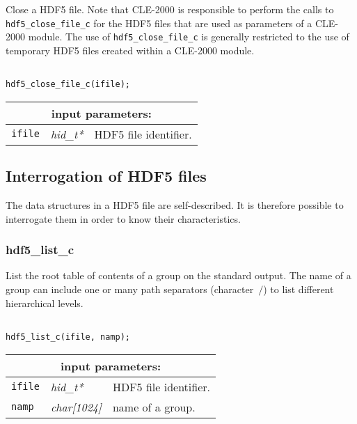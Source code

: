 Close a HDF5 file. Note that CLE-2000 is responsible to perform the calls to
{\tt hdf5\_close\_file\_c} for the HDF5 files that are used as parameters of a CLE-2000 module. The use
of {\tt hdf5\_close\_file\_c} is generally restricted to the use of temporary HDF5 files created within a CLE-2000 module.

\begin{verbatim}

hdf5_close_file_c(ifile);
\end{verbatim}

\noindent
\begin{tabular}{|p{1.5cm}|p{2cm}|p{11cm}|}
\hline
\multicolumn{3}{|c|}{\bf input parameters:} \\
\hline
{\tt ifile} & {\it hid\_t*} & HDF5 file identifier. \\
\hline
\end{tabular}

\vskip 0.8cm

\subsection{Interrogation of HDF5 files}

The data structures in a HDF5 file are self-described. It is therefore possible to interrogate them in order to know their characteristics.

\subsubsection{hdf5\_list\_c}

List the root table of contents of a group on the standard output. The name of a group can include one or many path separators (character~$\slash$)
to list different hierarchical levels.

\begin{verbatim}

hdf5_list_c(ifile, namp);
\end{verbatim}

\noindent
\begin{tabular}{|p{1.5cm}|p{2cm}|p{11cm}|}
\hline
\multicolumn{3}{|c|}{\bf input parameters:} \\
\hline
{\tt ifile} & {\it hid\_t*} & HDF5 file identifier. \\
\hline
{\tt namp} & {\it char[1024]} & name of a group. \\
\hline
\end{tabular}

